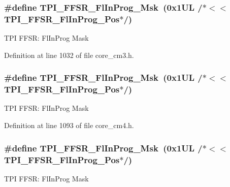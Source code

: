 \subsubsection[{\texorpdfstring{T\+P\+I\+\_\+\+F\+F\+S\+R\+\_\+\+Fl\+In\+Prog\+\_\+\+Msk}{TPI_FFSR_FlInProg_Msk}}]{\setlength{\rightskip}{0pt plus 5cm}\#define T\+P\+I\+\_\+\+F\+F\+S\+R\+\_\+\+Fl\+In\+Prog\+\_\+\+Msk~(0x1\+U\+L /$\ast$$<$$<$ T\+P\+I\+\_\+\+F\+F\+S\+R\+\_\+\+Fl\+In\+Prog\+\_\+\+Pos$\ast$/)}\hypertarget{group___c_m_s_i_s___t_p_i_ga63dfb09259893958962914fc3a9e3824}{}\label{group___c_m_s_i_s___t_p_i_ga63dfb09259893958962914fc3a9e3824}
T\+PI F\+F\+SR\+: Fl\+In\+Prog Mask 

Definition at line 1032 of file core\+\_\+cm3.\+h.

\subsubsection[{\texorpdfstring{T\+P\+I\+\_\+\+F\+F\+S\+R\+\_\+\+Fl\+In\+Prog\+\_\+\+Msk}{TPI_FFSR_FlInProg_Msk}}]{\setlength{\rightskip}{0pt plus 5cm}\#define T\+P\+I\+\_\+\+F\+F\+S\+R\+\_\+\+Fl\+In\+Prog\+\_\+\+Msk~(0x1\+U\+L /$\ast$$<$$<$ T\+P\+I\+\_\+\+F\+F\+S\+R\+\_\+\+Fl\+In\+Prog\+\_\+\+Pos$\ast$/)}\hypertarget{group___c_m_s_i_s___t_p_i_ga63dfb09259893958962914fc3a9e3824}{}\label{group___c_m_s_i_s___t_p_i_ga63dfb09259893958962914fc3a9e3824}
T\+PI F\+F\+SR\+: Fl\+In\+Prog Mask 

Definition at line 1093 of file core\+\_\+cm4.\+h.

\subsubsection[{\texorpdfstring{T\+P\+I\+\_\+\+F\+F\+S\+R\+\_\+\+Fl\+In\+Prog\+\_\+\+Msk}{TPI_FFSR_FlInProg_Msk}}]{\setlength{\rightskip}{0pt plus 5cm}\#define T\+P\+I\+\_\+\+F\+F\+S\+R\+\_\+\+Fl\+In\+Prog\+\_\+\+Msk~(0x1\+U\+L /$\ast$$<$$<$ T\+P\+I\+\_\+\+F\+F\+S\+R\+\_\+\+Fl\+In\+Prog\+\_\+\+Pos$\ast$/)}\hypertarget{group___c_m_s_i_s___t_p_i_ga63dfb09259893958962914fc3a9e3824}{}\label{group___c_m_s_i_s___t_p_i_ga63dfb09259893958962914fc3a9e3824}
T\+PI F\+F\+SR\+: Fl\+In\+Prog Mask 

